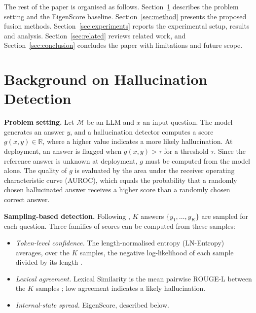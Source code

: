 \documentclass[10pt]{article}
\begin{document}
The rest of the paper is organised as follows. Section~\ref{sec:background} describes the problem setting and the EigenScore baseline. Section~\ref{sec:method} presents the proposed fusion methods. Section~\ref{sec:experiments} reports the experimental setup, results and analysis. Section~\ref{sec:related} reviews related work, and Section~\ref{sec:conclusion} concludes the paper with limitations and future scope.

\section{Background on Hallucination Detection}\label{sec:background}
\textbf{Problem setting.} Let $\mathcal{M}$ be an LLM and $x$ an input question. The model generates an answer $y$, and a hallucination detector computes a score $g(x,y)\in\mathbb{R}$, where a higher value indicates a more likely hallucination. At deployment, an answer is flagged when $g(x,y)>\tau$ for a threshold $\tau$. Since the reference answer is unknown at deployment, $g$ must be computed from the model alone. The quality of $g$ is evaluated by the area under the receiver operating characteristic curve (AUROC), which equals the probability that a randomly chosen hallucinated answer receives a higher score than a randomly chosen correct answer.

\textbf{Sampling-based detection.} Following \citet{chen2024inside}, $K$ answers $\{y_1,\dots,y_K\}$ are sampled for each question. Three families of scores can be computed from these samples:
\begin{itemize}
\item \emph{Token-level confidence.} The length-normalised entropy (LN-Entropy) averages, over the $K$ samples, the negative log-likelihood of each sample divided by its length \citep{malinin2021}.
\item \emph{Lexical agreement.} Lexical Similarity is the mean pairwise ROUGE-L \citep{lin2004rouge} between the $K$ samples \citep{lin2023generating}; low agreement indicates a likely hallucination.
\item \emph{Internal-state spread.} EigenScore, described below.
\end{itemize}
\end{document}
